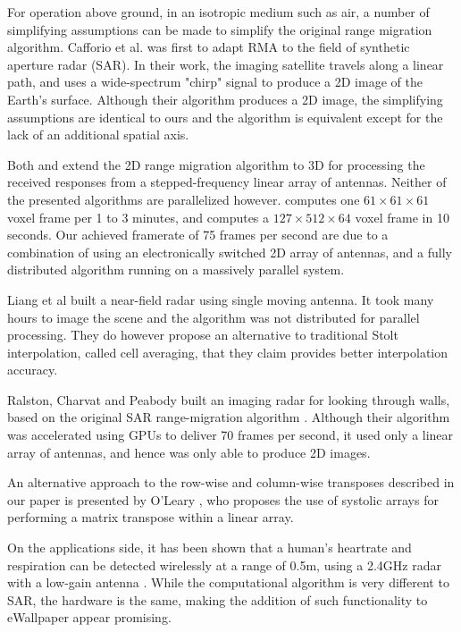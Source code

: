 \documentclass[twocolumn]{article}
\begin{document}
For operation above ground, in an isotropic medium such as air, a number of simplifying assumptions can be made to simplify the original range migration algorithm. Cafforio et al. \cite{sar-data-focussing} was first to adapt RMA to the field of synthetic aperture radar (SAR). In their work, the imaging satellite travels along a linear path, and uses a wide-spectrum "chirp" signal to produce a 2D image of the Earth's surface. Although their algorithm produces a 2D image, the simplifying assumptions are identical to ours and the algorithm is equivalent except for the lack of an additional spatial axis.

Both \cite{lopez20003} and \cite{3d-imaging-concealed-weapon} extend the 2D range migration algorithm to 3D for processing the received responses from a stepped-frequency linear array of antennas. Neither of the presented algorithms are parallelized however. \cite{lopez20003} computes one $61\times61\times61$ voxel frame per 1 to 3 minutes, and \cite{3d-imaging-concealed-weapon} computes a $127\times512\times64$ voxel frame in 10 seconds. Our achieved framerate of 75 frames per second are due to a combination of using an electronically switched 2D array of antennas, and a fully distributed algorithm running on a massively parallel system.

Liang et al \cite{near-field-3d-stolt} built a near-field radar using single moving antenna. It took many hours to image the scene and the algorithm was not distributed for parallel processing. They do however propose an alternative to traditional Stolt interpolation, called cell averaging, that they claim provides better interpolation accuracy.

Ralston, Charvat and Peabody \cite{thru-wall-mimo} built an imaging radar for looking through walls, based on the original SAR range-migration algorithm \cite{sar-data-focussing}. Although their algorithm was accelerated using GPUs to deliver 70 frames per second, it used only a linear array of antennas, and hence was only able to produce 2D images.

An alternative approach to the row-wise and column-wise transposes described in our paper is presented by O'Leary \cite{systolic-arrays-transpose}, who proposes the use of systolic arrays for performing a matrix transpose within a linear array.

On the applications side, it has been shown that a human's heartrate and respiration can be detected wirelessly at a range of 0.5m, using a 2.4GHz radar with a low-gain antenna \cite{bioradar}. While the computational algorithm is very different to SAR, the hardware is the same, making the addition of such functionality to eWallpaper appear promising.
\end{document}
